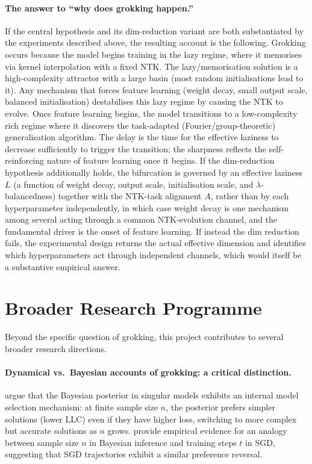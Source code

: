 \documentclass[11pt,a4paper]{article}
\begin{document}
\paragraph{The answer to ``why does grokking happen.''} If the central hypothesis and its dim-reduction variant are both substantiated by the experiments described above, the resulting account is the following. Grokking occurs because the model begins training in the lazy regime, where it memorises via kernel interpolation with a fixed NTK. The lazy/memorisation solution is a high-complexity attractor with a large basin (most random initialisations lead to it). Any mechanism that forces feature learning (weight decay, small output scale, balanced initialisation) destabilises this lazy regime by causing the NTK to evolve. Once feature learning begins, the model transitions to a low-complexity rich regime where it discovers the task-adapted (Fourier/group-theoretic) generalisation algorithm. The delay is the time for the effective laziness to decrease sufficiently to trigger the transition; the sharpness reflects the self-reinforcing nature of feature learning once it begins. If the dim-reduction hypothesis additionally holds, the bifurcation is governed by an effective laziness $L$ (a function of weight decay, output scale, initialisation scale, and $\lambda$-balancedness) together with the NTK-task alignment $A$, rather than by each hyperparameter independently, in which case weight decay is one mechanism among several acting through a common NTK-evolution channel, and the fundamental driver is the onset of feature learning. If instead the dim reduction fails, the experimental design returns the actual effective dimension and identifies which hyperparameters act through independent channels, which would itself be a substantive empirical answer.

\section{Broader Research Programme}\label{sec:broader}

Beyond the specific question of grokking, this project contributes to several broader research directions.

\paragraph{Dynamical vs.\ Bayesian accounts of grokking: a critical distinction.} \citet{pepinlehalleur2025youare} argue that the Bayesian posterior in singular models exhibits an internal model selection mechanism: at finite sample size $n$, the posterior prefers simpler solutions (lower LLC) even if they have higher loss, switching to more complex but accurate solutions as $n$ grows. \citet{carroll2025incl} provide empirical evidence for an analogy between sample size $n$ in Bayesian inference and training steps $t$ in SGD, suggesting that SGD trajectories exhibit a similar preference reversal.
\end{document}

